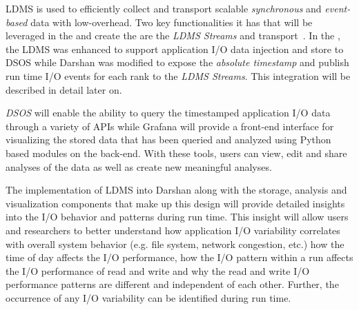 \documentclass[conference]{IEEEtran}
\begin{document}
LDMS is used to efficiently collect and transport scalable \emph{synchronous} and \emph{event-based} data with low-overhead. Two key functionalities it has that will be leveraged in the \Darshan and create the \connector are the \emph{LDMS Streams} and transport~\cite{ldmsgithub}. In the \Darshan, the LDMS was enhanced to support application I/O data injection and store to DSOS while Darshan was modified to expose the \emph{absolute timestamp} and publish run time I/O events for each rank to the \emph{LDMS Streams}. This integration will be described in detail later on.   


\emph{DSOS} will enable the ability to query the timestamped application I/O data through a variety of APIs while Grafana will provide a front-end interface for visualizing the stored data that has been queried and analyzed using Python based modules on the back-end. With these tools, users can view, edit and share analyses of the data as well as create new meaningful analyses. 

The implementation of LDMS into Darshan along with the storage, analysis and visualization components that make up this design will provide detailed insights into the I/O behavior and patterns during run time. This insight will allow users and researchers to better understand how application I/O variability correlates with overall system behavior (e.g. file system, network congestion, etc.) how the time of day affects the I/O performance, how the I/O pattern within a run affects the I/O performance of read and write and why the read and write I/O performance patterns are different and independent of each other. Further, the occurrence of any I/O variability can be identified during run time.
\end{document}
